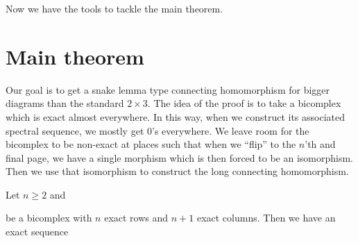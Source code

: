 Now we have the tools to tackle the main theorem. 
\section{Main theorem}

Our goal is to get a snake lemma type connecting homomorphism for bigger diagrams than the standard $2\times3$. The idea of the proof is to take a bicomplex which is exact almost everywhere. In this way, when we construct its associated spectral sequence, we mostly get 0's everywhere. We leave room for the bicomplex to be non-exact at places such that when we ``flip'' to the $n$'th and final page, we have a single morphism which is then forced to be an isomorphism. Then we use that isomorphism to construct the long connecting homomorphism. 

\begin{theorem}
\label{Thm:long}
Let $n \geq 2$ and
\begin{center}
\end{center}
be a bicomplex with $n$ exact rows and $n+1$ exact columns. Then we have an exact sequence
\begin{center}
\end{center}
\end{theorem}

